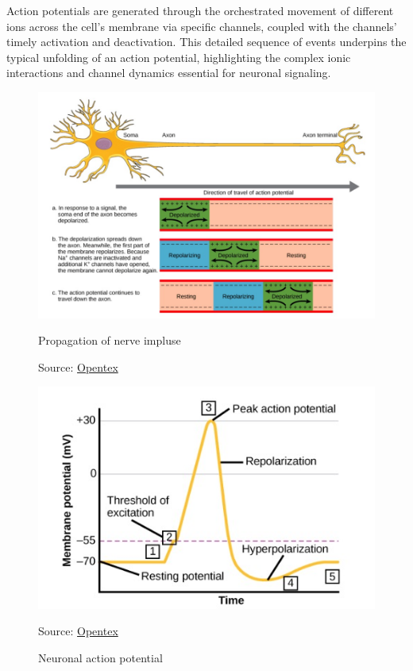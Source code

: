 \documentclass[12pt,a4paper]{report}
\begin{document}
Action potentials are generated through the orchestrated movement of different ions across the cell's membrane via specific channels, coupled with the channels' timely activation and deactivation. This detailed sequence of events underpins the typical unfolding of an action potential, highlighting the complex ionic interactions and channel dynamics essential for neuronal signaling.
\begin{figure}[H]
    \centering
    \begin{minipage}[b]{0.45\textwidth}
      \centering
      \includegraphics[width=\textwidth]{./data/propagation-of-nerve-impluse.jpg}
      \caption{Propagation of nerve impluse}
      \label{fig:exampleA}
      \vspace{1pt} %
      \small{Source: \href{https://opentextbc.ca/biology/chapter/16-2-how-neurons-communicate/}{Opentex}}
    \end{minipage}
    \hfill
    \begin{minipage}[b]{0.45\textwidth}
      \centering
      \includegraphics[width=\textwidth]{./data/neuronal-action-potential.jpg}
      \caption{Neuronal action potential}
      \label{fig:exampleB}
      \vspace{1pt} %
      \small{Source: \href{https://opentextbc.ca/biology/chapter/16-2-how-neurons-communicate/}{Opentex}}
    \end{minipage}
\end{figure}
\end{document}

